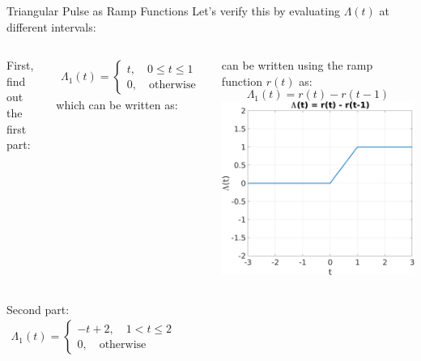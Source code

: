 \documentclass[aspectratio=169,xcolor=dvipsnames,svgnames,x11names,fleqn]{beamer}
\begin{document}
\begin{frame}[allowframebreaks]{Triangular Pulse as Ramp Functions}
Let's verify this by evaluating \( \Lambda(t) \) at different intervals:

\begin{columns}
     First, find out the first part:

    \begin{equation*}
            \begin{aligned}
              \Lambda_1(t) =  \begin{cases}
            t ,\quad 0 \leq t \leq 1\\
            0,\quad \textrm{otherwise}
        \end{cases}
            \end{aligned}
        \end{equation*}
    which can be written as:

can be written using the ramp function \( r(t) \) as:
    \begin{equation*}
        \Lambda_1(t) = r(t) - r(t-1)
    \end{equation*}
    \includegraphics[width=0.75\linewidth,trim=0 0 0 0cm,clip]{figures/lambda_1.png}
\end{columns}

\begin{columns}
    Second part:
     \begin{equation*}
            \begin{aligned}
              \Lambda_1(t) =  \begin{cases}
            -t + 2, \quad 1 < t \leq 2\\
            0,\quad \textrm{otherwise}
        \end{cases}
            \end{aligned}
        \end{equation*}


\end{columns}
\end{frame}
\end{document}
